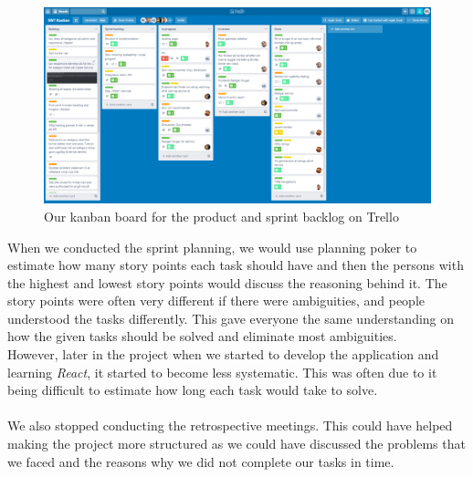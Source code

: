 \begin{figure}[H]
    \centering
    \includegraphics[width=0.8\linewidth]{figures/trellopicture.PNG}
    \caption{Our kanban board for the product and sprint backlog on Trello}
    \label{fig:trello-kanban}
\end{figure}
\noindent
When we conducted the sprint planning, we would use planning poker to estimate how many story points each task should have and then the persons with the highest and lowest story points would discuss the reasoning behind it.
The story points were often very different if there were ambiguities, and people understood the tasks differently.
This gave everyone the same understanding on how the given tasks should be solved and eliminate most ambiguities. 
\\
However, later in the project when we started to develop the application and learning \textit{React}, it started to become less systematic.
This was often due to it being difficult to estimate how long each task would take to solve.
\\\\
We also stopped conducting the retrospective meetings. 
This could have helped making the project more structured as we could have discussed the problems that we faced and the reasons why we did not complete our tasks in time.

